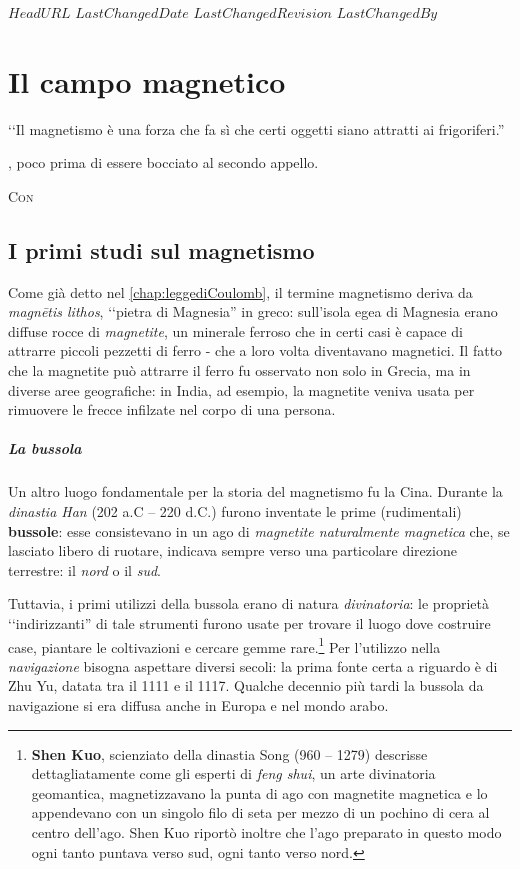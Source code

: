 \svnidlong
{$HeadURL$}
{$LastChangedDate$}
{$LastChangedRevision$}
{$LastChangedBy$}

\chapter{Il campo magnetico}

\begin{introduction}
	‘‘Il magnetismo è una forza che fa sì che certi oggetti siano attratti ai frigoriferi.''
	\begin{flushright}
		, poco prima di essere bocciato al secondo appello.
	\end{flushright}
\end{introduction}
\lettrine[findent=1pt, nindent=0pt]{C}{on}

\section{I primi studi sul magnetismo}
Come già detto nel \autoref{chap:leggediCoulomb}, il termine magnetismo deriva da \textit{magnētis lithos}, ‘‘pietra di Magnesia'' in greco: sull'isola egea di Magnesia erano diffuse rocce di \textit{magnetite}, un minerale ferroso che in certi casi è capace di attrarre piccoli pezzetti di ferro - che a loro volta diventavano magnetici.
Il fatto che la magnetite può attrarre il ferro fu osservato non solo in Grecia, ma in diverse aree geografiche: in India, ad esempio, la magnetite veniva usata per rimuovere le frecce infilzate nel corpo di una persona.
\paragraph{La bussola}
Un altro luogo fondamentale per la storia del magnetismo fu la Cina. Durante la \textit{dinastia Han} (202 a.C – 220 d.C.) furono inventate le prime (rudimentali) \textbf{bussole}: esse consistevano in un ago di \textit{magnetite naturalmente magnetica} che, se lasciato libero di ruotare, indicava sempre verso una particolare direzione terrestre: il \textit{nord} o il \textit{sud}.

Tuttavia, i primi utilizzi della bussola erano di natura \textit{divinatoria}: le proprietà ‘‘indirizzanti'' di tale strumenti furono usate per trovare il luogo dove costruire case, piantare le coltivazioni e cercare gemme rare.\footnote{\textbf{Shen Kuo}, scienziato della dinastia Song (960 – 1279) descrisse dettagliatamente come gli esperti di \textit{feng shui}, un arte divinatoria geomantica, magnetizzavano la punta di ago con magnetite magnetica e lo appendevano con un singolo filo di seta per mezzo di un pochino di cera al centro dell'ago. Shen Kuo riportò inoltre che l'ago preparato in questo modo ogni tanto puntava verso sud, ogni tanto verso nord.} Per l'utilizzo nella \textit{navigazione} bisogna aspettare diversi secoli: la prima fonte certa a riguardo è di Zhu Yu, datata tra il 1111 e il 1117. Qualche decennio più tardi la bussola da navigazione si era diffusa anche in Europa e nel mondo arabo.

